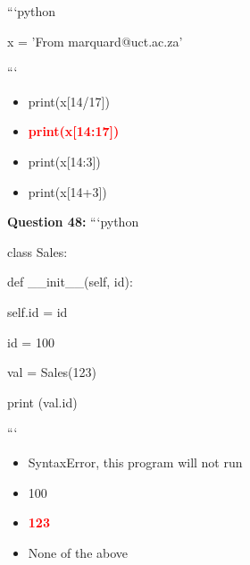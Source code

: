 \documentclass[12pt,a4paper]{article}
\begin{document}
\newline
\newline

\newline
```python\newline

\newline
x = 'From marquard@uct.ac.za'\newline

\newline
```

\begin{itemize}
    \item[\textbf{A.}] print(x[14/17])
    \item[\textbf{B.}] \textcolor{red}{\textbf{print(x[14:17])}}
    \item[\textbf{C.}] print(x[14:3])
    \item[\textbf{D.}] print(x[14+3])
\end{itemize}

\vspace{0.5cm}

\textbf{Question 48:} ```python\newline

\newline
class Sales:\newline

\newline
    def __init__(self, id):\newline

\newline
        self.id = id\newline

\newline
        id = 100\newline

\newline
\newline

\newline
val = Sales(123)\newline

\newline
print (val.id)\newline

\newline
```

\begin{itemize}
    \item[\textbf{A.}] SyntaxError, this program will not run
    \item[\textbf{B.}] 100
    \item[\textbf{C.}] \textcolor{red}{\textbf{123}}
    \item[\textbf{D.}] None of the above
\end{itemize}
\end{document}
